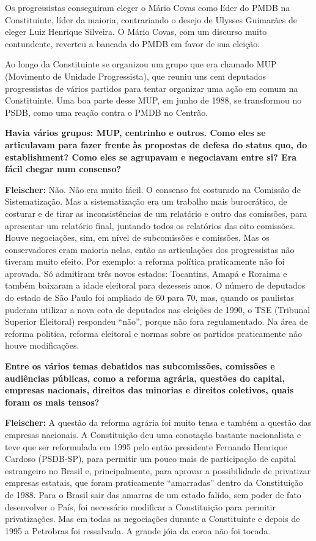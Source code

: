 Os progressistas conseguiram eleger o Mário Covas como líder do PMDB na
Constituinte, líder da maioria, contrariando o desejo de Ulysses
Guimarães de eleger Luiz Henrique Silveira. O Mário Covas, com um
discurso muito contundente, reverteu a bancada do PMDB em favor de sua
eleição.

Ao longo da Constituinte se organizou um grupo que era chamado MUP
(Movimento de Unidade Progressista), que reuniu uns cem deputados
progressistas de vários partidos para tentar organizar uma ação em comum
na Constituinte. Uma boa parte desse MUP, em junho de 1988, se
transformou no PSDB, como uma reação contra o PMDB no Centrão.

\textbf{Havia vários grupos: MUP, centrinho e outros. Como eles se
articulavam para fazer frente às propostas de defesa do status quo, do
establishment? Como eles se agrupavam e negociavam entre si? Era fácil
chegar num consenso?}

\textbf{Fleischer:} Não. Não era muito fácil. O consenso foi costurado
na Comissão de Sistematização. Mas a sistematização era um trabalho mais
burocrático, de costurar e de tirar as inconsistências de um relatório e
outro das comissões, para apresentar um relatório final, juntando todos
os relatórios das oito comissões. Houve negociações, sim, em nível de
subcomissões e comissões. Mas os conservadores eram maioria nelas, então
as articulações dos progressistas não tiveram muito efeito. Por exemplo:
a reforma política praticamente não foi aprovada. Só admitiram três
novos estados: Tocantins, Amapá e Roraima e também baixaram a idade
eleitoral para dezesseis anos. O número de deputados do estado de São
Paulo foi ampliado de 60 para 70, mas, quando os paulistas puderam
utilizar a nova cota de deputados nas eleições de 1990, o TSE (Tribunal
Superior Eleitoral) respondeu ``não'', porque não fora regulamentado. Na
área de reforma politica, reforma eleitoral e normas sobre os partidos
praticamente não houve modificações.

\textbf{Entre os vários temas debatidos nas subcomissões, comissões e
audiências públicas, como a reforma agrária, questões do capital,
empresas nacionais, direitos das minorias e direitos coletivos, quais
foram os mais tensos?}

\textbf{Fleischer:} A questão da reforma agrária foi muito tensa e
também a questão das empresas nacionais. A Constituição deu uma
conotação bastante nacionalista e teve que ser reformulada em 1995 pelo
então presidente Fernando Henrique Cardoso (PSDB-SP), para permitir um
pouco mais de participação de capital estrangeiro no Brasil e,
principalmente, para aprovar a possibilidade de privatizar empresas
estatais, que foram praticamente ``amarradas'' dentro da Constituição de
1988. Para o Brasil sair das amarras de um estado falido, sem poder de
fato desenvolver o País, foi necessário modificar a Constituição para
permitir privatizações. Mas em todas as negociações durante a
Constituinte e depois de 1995 a Petrobras foi ressalvada. A grande jóia
da coroa não foi tocada.

